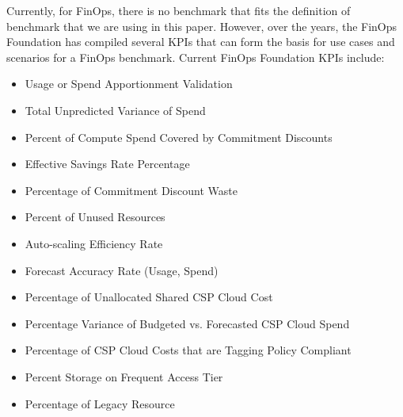 Currently, for FinOps, there is no benchmark that fits the definition of benchmark that we are using in this paper. However, over the years, the FinOps Foundation \cite{finopsbench} has compiled several KPIs that can form the basis for use cases and scenarios for a FinOps benchmark. 
Current FinOps Foundation KPIs include:
\begin{itemize}[left=0pt, topsep=0pt, partopsep=0pt, itemsep=0pt, parsep=0pt]
\item Usage or Spend Apportionment Validation
\item Total Unpredicted Variance of Spend
\item Percent of Compute Spend Covered by Commitment Discounts
\item Effective Savings Rate Percentage 
\item Percentage of Commitment Discount Waste
\item Percent of Unused Resources
\item Auto-scaling Efficiency Rate 
\item Forecast Accuracy Rate (Usage, Spend) 
\item Percentage of Unallocated Shared CSP Cloud Cost
\item Percentage Variance of Budgeted vs. Forecasted CSP Cloud Spend
\item Percentage of CSP Cloud Costs that are Tagging Policy Compliant
\item Percent Storage on Frequent Access Tier  
\item Percentage of Legacy Resource
\end{itemize}

